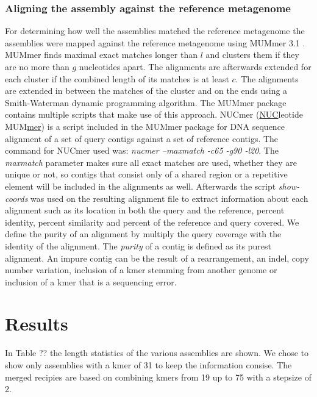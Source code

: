 \subsubsection*{Aligning the assembly against the reference metagenome} For
determining how well the assemblies matched the reference metagenome the
assemblies were mapped against the reference metagenome using MUMmer 3.1
\cite{Kurtz14759262}.  MUMmer finds maximal exact matches longer than $l$ and
clusters them if they are no more than $g$ nucleotides apart. The alignments
are afterwards extended for each cluster if the combined length of its matches
is at least $c$. The alignments are extended in between the matches of the
cluster and on the ends using a Smith-Waterman dynamic programming algorithm.
The MUMmer package contains multiple scripts that make use of this approach.
NUCmer (\underline{NUC}leotide MUM\underline{mer}) is a script included in the
MUMmer package for DNA sequence alignment of a set of query contigs against a
set of reference contigs. The command for NUCmer used was: {\em nucmer
--maxmatch -c65 -g90 -l20}. The {\em maxmatch} parameter makes sure all exact matches
are used, whether they are unique or not, so contigs that consist only of a
shared region or a repetitive element will be included in the alignments as
well. Afterwards the script {\em show-coords} was used on the resulting
alignment file to extract information about each alignment such as its location
in both the query and the reference, percent identity, percent similarity and
percent of the reference and query covered. We define the purity of an
alignment by multiply the query coverage with the identity of the alignment. The {\em purity} of
a contig is defined as its purest alignment. An impure contig can be the result
of a rearrangement, an indel, copy number variation, inclusion of a kmer
stemming from another genome or inclusion of a kmer that is a sequencing
error.\\


\section*{Results}
In Table ?? the length statistics of the various assemblies are shown. We chose
to show only assemblies with a kmer of 31 to keep the information consise. The
merged recipies are based on combining kmers from 19 up to 75 with a stepsize
of 2.


